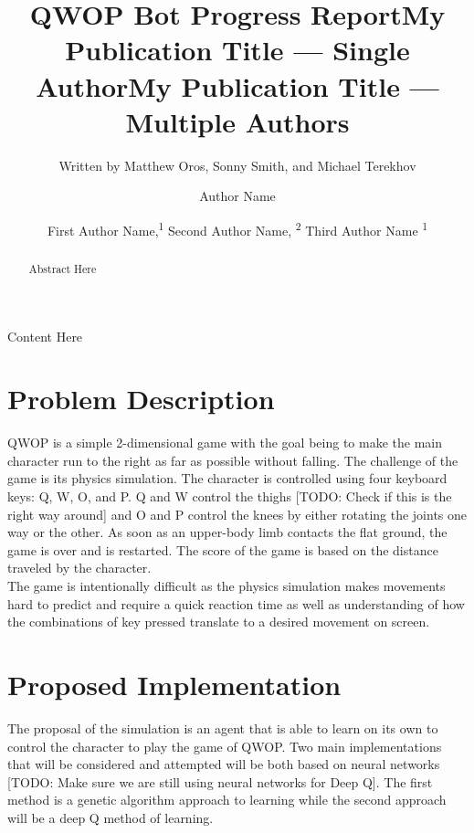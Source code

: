 \documentclass[letterpaper]{article} %
\title{QWOP Bot Progress Report}
\author{
    Written by Matthew Oros, Sonny Smith, and Michael Terekhov \\ 
}
\title{My Publication Title --- Single Author}
\author {
    Author Name \\
}
\title{My Publication Title --- Multiple Authors}
\author {
    First Author Name,\textsuperscript{\rm 1}
    Second Author Name, \textsuperscript{\rm 2}
    Third Author Name \textsuperscript{\rm 1} \\
}
\begin{document}
\maketitle

\begin{abstract}
Abstract Here
\end{abstract}

\noindent Content Here

\section{Problem Description}
QWOP is a simple 2-dimensional game with the goal being to make the main character run to the right as far as possible without falling. The challenge of the game is its physics simulation. The character is controlled using four keyboard keys: Q, W, O, and P. Q and W control the thighs [TODO: Check if this is the right way around] and O and P control the knees by either rotating the joints one way or the other. As soon as an upper-body limb contacts the flat ground, the game is over and is restarted. The score of the game is based on the distance traveled by the character. \\
\indent The game is intentionally difficult as the physics simulation makes movements hard to predict and require a quick reaction time as well as understanding of how the combinations of key pressed translate to a desired movement on screen.

\section{Proposed Implementation}
The proposal of the simulation is an agent that is able to learn on its own to control the character to play the game of QWOP. Two main implementations that will be considered and attempted will be both based on neural networks [TODO: Make sure we are still using neural networks for Deep Q]. The first method is a genetic algorithm approach to learning while the second approach will be a deep Q method of learning.
\end{document}
